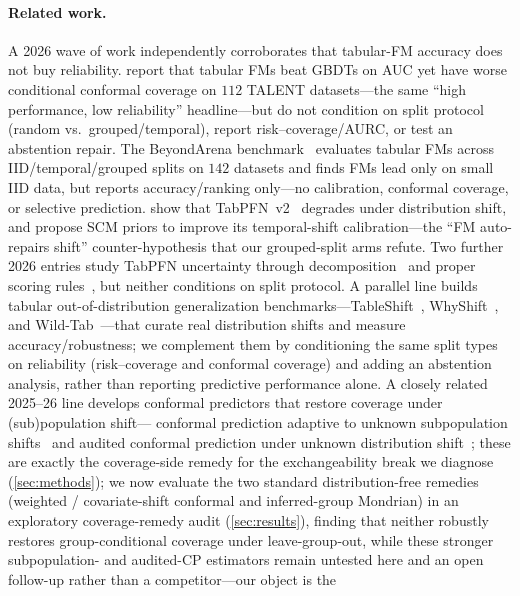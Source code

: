 \documentclass[pdflatex,sn-mathphys-num]{sn-jnl}
\begin{document}
\paragraph{Related work.} A 2026 wave of work independently corroborates that tabular-FM accuracy does not buy
reliability. \citet{tfm_uncertainty_esann2026} report that tabular FMs beat GBDTs on AUC yet have worse
conditional conformal coverage on $112$ TALENT datasets---the same ``high performance, low reliability''
headline---but do not condition on split protocol (random vs.\ grouped/temporal), report risk--coverage/AURC,
or test an abstention repair. The BeyondArena benchmark~\citep{beyondiid2026} evaluates tabular FMs across
IID/temporal/grouped splits on $142$ datasets and finds FMs lead only on small IID data, but reports
accuracy/ranking only---no calibration, conformal coverage, or selective prediction.
\citet{tabpfn_openenv2025} show that TabPFN~v2~\citep{hollmann2025tabpfn} degrades under distribution shift, and \citet{helli2024driftresilient}
propose SCM priors to improve its temporal-shift calibration---the ``FM auto-repairs shift'' counter-hypothesis
that our grouped-split arms refute. Two further 2026 entries study TabPFN uncertainty through
decomposition~\citep{tabpfn_uncdecomp2026} and proper scoring rules~\citep{distreg_tfm2026}, but neither
conditions on split protocol. A parallel line builds tabular out-of-distribution generalization
benchmarks---TableShift~\citep{gardner2023tableshift}, WhyShift~\citep{whyshift2023}, and
Wild-Tab~\citep{wildtab2023}---that curate real distribution shifts and measure accuracy/robustness;
we complement them by conditioning the same split types on reliability (risk--coverage and conformal
coverage) and adding an abstention analysis, rather than reporting predictive performance alone. A closely
related 2025--26 line develops conformal predictors that restore coverage under (sub)population shift---
conformal prediction adaptive to unknown subpopulation shifts~\citep{subpop2025conformal} and audited conformal
prediction under unknown distribution shift~\citep{audited2026conformal}; these are exactly the coverage-side
remedy for the exchangeability break we diagnose (\cref{sec:methods}); we now evaluate the two standard
distribution-free remedies (weighted / covariate-shift conformal and inferred-group Mondrian) in an
exploratory coverage-remedy audit (\cref{sec:results}), finding that neither robustly restores
group-conditional coverage under leave-group-out, while these stronger subpopulation- and audited-CP
estimators remain untested here and an open follow-up rather than a competitor---our object is the
\end{document}
